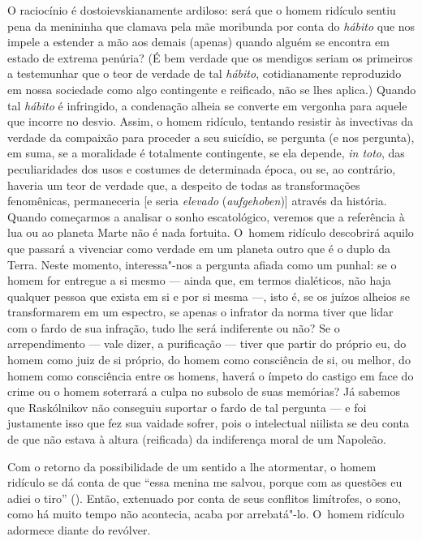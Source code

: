 O raciocínio é dostoievskianamente ardiloso: será que o homem ridículo
sentiu pena da menininha que clamava pela mãe moribunda por conta do
\emph{hábito} que nos impele a estender a mão aos demais (apenas) quando
alguém se encontra em estado de extrema penúria? (É bem verdade que os
mendigos seriam os primeiros a testemunhar que o teor de verdade de tal
\emph{hábito}, cotidianamente reproduzido em nossa sociedade como algo
contingente e reificado, não se lhes aplica.) Quando tal \emph{hábito} é
infringido, a condenação alheia se converte em vergonha para aquele que
incorre no desvio. Assim, o homem ridículo, tentando resistir às
invectivas da verdade da compaixão para proceder a seu suicídio, se
pergunta (e nos pergunta), em suma, se a moralidade é totalmente
contingente, se ela depende, \emph{in toto}, das peculiaridades dos usos
e costumes de determinada época, ou se, ao contrário, haveria um teor de
verdade que, a despeito de todas as transformações fenomênicas,
permaneceria {[}e seria \emph{elevado} (\emph{aufgehoben}){]} através da
história. Quando começarmos a analisar o sonho escatológico, veremos que
a referência à lua ou ao planeta Marte não é nada fortuita. O~homem
ridículo descobrirá aquilo que passará a vivenciar como verdade em um
planeta outro que é o duplo da Terra. Neste momento, interessa"-nos a
pergunta afiada como um punhal: se o homem for entregue a si mesmo ---
ainda que, em termos dialéticos, não haja qualquer pessoa que exista em
si e por si mesma ---, isto é, se os juízos alheios se transformarem em
um espectro, se apenas o infrator da norma tiver que lidar com o fardo
de sua infração, tudo lhe será indiferente ou não? Se o arrependimento
--- vale dizer, a purificação --- tiver que partir do próprio eu, do homem
como juiz de si próprio, do homem como consciência de si, ou melhor, do
homem como consciência entre os homens, haverá o ímpeto do castigo em
face do crime ou o homem soterrará a culpa no subsolo de suas memórias?
Já sabemos que Raskólnikov não conseguiu suportar o fardo de tal
pergunta --- e foi justamente isso que fez sua vaidade sofrer, pois o
intelectual niilista se deu conta de que não estava à altura (reificada)
da indiferença moral de um Napoleão.

Com o retorno da possibilidade de um sentido a lhe atormentar, o homem
ridículo se dá conta de que ``essa menina me salvou, porque com as
questões eu adiei o tiro'' (). Então, extenuado por conta de seus
conflitos limítrofes, o sono, como há muito tempo não acontecia, acaba
por arrebatá"-lo. O~homem ridículo adormece diante do revólver.

